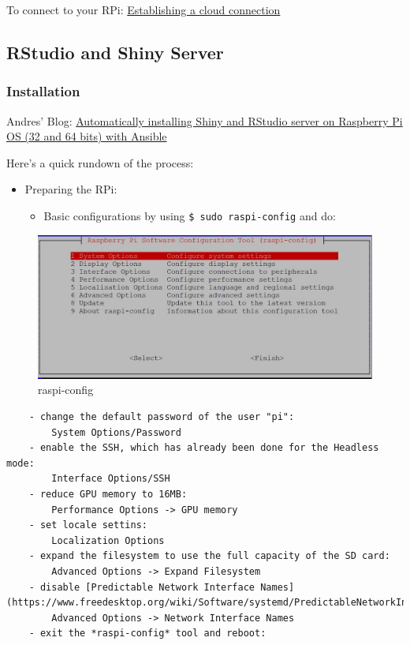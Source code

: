 To connect to your RPi:
\href{https://www.raspberrypi.com/documentation/computers/remote-access.html\#establishing-a-cloud-connection}{Establishing
a cloud connection}

\newpage

\hypertarget{rstudio-and-shiny-server}{%
\subsection{RStudio and Shiny Server}\label{rstudio-and-shiny-server}}

\hypertarget{installation}{%
\subsubsection{Installation}\label{installation}}

Andres' Blog:
\href{https://andresrcs.rbind.io/2021/01/13/raspberry_pi_server/}{Automatically
installing Shiny and RStudio server on Raspberry Pi OS (32 and 64 bits)
with Ansible}

Here's a quick rundown of the process:

\begin{itemize}
\item
  Preparing the RPi:

  \begin{itemize}
  \tightlist
  \item
    Basic configurations by using \texttt{\$\ sudo\ raspi-config} and
    do:
  \end{itemize}
\end{itemize}

\begin{figure}
\centering
\includegraphics{./media/raspi-config.jpg}
\caption{raspi-config}
\end{figure}

\begin{verbatim}
    - change the default password of the user "pi":
        System Options/Password
    - enable the SSH, which has already been done for the Headless mode:
        Interface Options/SSH
    - reduce GPU memory to 16MB:
        Performance Options -> GPU memory
    - set locale settins:
        Localization Options
    - expand the filesystem to use the full capacity of the SD card:
        Advanced Options -> Expand Filesystem
    - disable [Predictable Network Interface Names](https://www.freedesktop.org/wiki/Software/systemd/PredictableNetworkInterfaceNames/):
        Advanced Options -> Network Interface Names
    - exit the *raspi-config* tool and reboot:
\end{verbatim}


